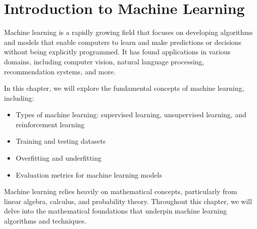 \documentclass[main.tex]{subfiles}
\begin{document}
\chapter{Introduction to Machine Learning}

Machine learning is a rapidly growing field that focuses on developing algorithms and models that enable computers to learn and make predictions or decisions without being explicitly programmed. It has found applications in various domains, including computer vision, natural language processing, recommendation systems, and more.

In this chapter, we will explore the fundamental concepts of machine learning, including:

\begin{itemize}
  \item Types of machine learning: supervised learning, unsupervised learning, and reinforcement learning
  \item Training and testing datasets
  \item Overfitting and underfitting
  \item Evaluation metrics for machine learning models
\end{itemize}

Machine learning relies heavily on mathematical concepts, particularly from linear algebra, calculus, and probability theory. Throughout this chapter, we will delve into the mathematical foundations that underpin machine learning algorithms and techniques.
\end{document}
